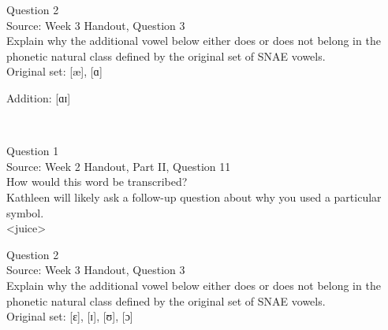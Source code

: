 \documentclass[12pt]{article}
\begin{document}
\newpage

{\large Question 2}\\

Source: Week 3 Handout, Question 3\\

Explain why the additional vowel below either does or does not belong in the phonetic natural class defined by the original set of SNAE vowels.\\

Original set: {[æ]}, {[ɑ]}

Addition: {[ɑɪ]}


\newpage

\begin{center}
\textbf{{\color{red}{\HUGE END OF EXAM}}}\\

\end{center}
\newpage

\begin{center}
\textbf{{\color{blue}{\HUGE START OF EXAM\\}}}

\textbf{{\color{blue}{\HUGE Student ID: 72428\\}}}

\textbf{{\color{blue}{\HUGE 4:40\\}}}

\end{center}
\newpage

{\large Question 1}\\

Source: Week 2 Handout, Part II, Question 11\\

How would this word be transcribed?\\ Kathleen will likely ask a follow-up question about why you used a particular symbol.\\

<juice>


\newpage

{\large Question 2}\\

Source: Week 3 Handout, Question 3\\

Explain why the additional vowel below either does or does not belong in the phonetic natural class defined by the original set of SNAE vowels.\\

Original set: {[ɛ]}, {[ɪ]}, {[ʊ]}, {[ɔ]}
\end{document}
